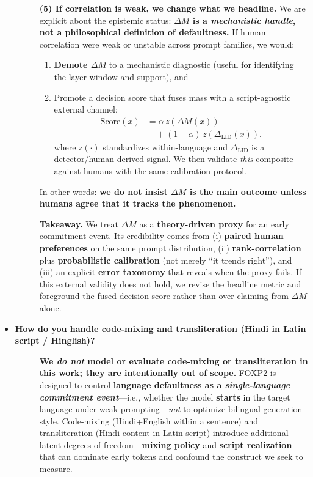 \begin{itemize}[leftmargin=1.5em]
\begin{description}
\vspace{6pt}
\textbf{(5) If correlation is weak, we change what we headline.}
We are explicit about the epistemic status: \textbf{$\Delta M$ is a \emph{mechanistic handle}, not a philosophical definition of defaultness.} If human correlation were weak or unstable across prompt families, we would:
\begin{enumerate}[leftmargin=*,itemsep=2pt]
\item \textbf{Demote $\Delta M$} to a mechanistic diagnostic (useful for identifying the layer window and support), and
\item Promote a decision score that fuses mass with a script-agnostic external channel:
\[
\begin{alignedat}{2}
\text{Score}(x)
&= \alpha\, z(\Delta M(x)) \\
&\quad {}+ (1-\alpha)\, z(\Delta_{\mathrm{LID}}(x)).
\end{alignedat}
\]
where $\mathrm{z}(\cdot)$ standardizes within-language and $\Delta_{\mathrm{LID}}$ is a detector/human-derived signal. We then validate \emph{this} composite against humans with the same calibration protocol.
\end{enumerate}
In other words: \textbf{we do not insist $\Delta M$ is the main outcome unless humans agree that it tracks the phenomenon.}

\vspace{6pt}
\textbf{Takeaway.} We treat $\Delta M$ as a \textbf{theory-driven proxy} for an early commitment event. Its credibility comes from (i) \textbf{paired human preferences} on the same prompt distribution, (ii) \textbf{rank-correlation} plus \textbf{probabilistic calibration} (not merely “it trends right”), and (iii) an explicit \textbf{error taxonomy} that reveals when the proxy fails. If this external validity does not hold, we revise the headline metric and foreground the fused decision score rather than over-claiming from $\Delta M$ alone.
\end{description}



\item[\ding{93}] \textbf{How do you handle code-mixing and transliteration (Hindi in Latin script / Hinglish)?}
\begin{description}
\item[] \textbf{We \emph{do not} model or evaluate code-mixing or transliteration in this work; they are intentionally out of scope.}
FOXP2 is designed to control \textbf{language defaultness as a \emph{single-language commitment event}}—i.e., whether the model \textbf{starts} in the target language under weak prompting—\emph{not} to optimize bilingual generation style. Code-mixing (Hindi+English within a sentence) and transliteration (Hindi content in Latin script) introduce additional latent degrees of freedom—\textbf{mixing policy} and \textbf{script realization}—that can dominate early tokens and confound the construct we seek to measure.


\end{description}
\end{itemize}
